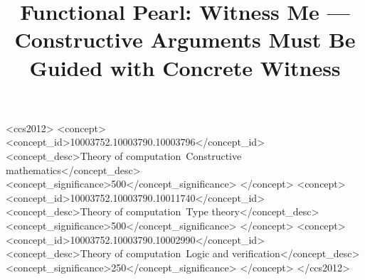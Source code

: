 \documentclass[sigplan,review]{acmart}
\begin{document}
\title[Functional Pearl: Witness Me]{Functional Pearl: Witness Me --- Constructive Arguments Must Be Guided with Concrete Witness}



\begin{abstract}
  
\end{abstract}

\begin{CCSXML}
<ccs2012>
   <concept>
       <concept_id>10003752.10003790.10003796</concept_id>
       <concept_desc>Theory of computation~Constructive mathematics</concept_desc>
       <concept_significance>500</concept_significance>
       </concept>
   <concept>
       <concept_id>10003752.10003790.10011740</concept_id>
       <concept_desc>Theory of computation~Type theory</concept_desc>
       <concept_significance>500</concept_significance>
       </concept>
   <concept>
       <concept_id>10003752.10003790.10002990</concept_id>
       <concept_desc>Theory of computation~Logic and verification</concept_desc>
       <concept_significance>250</concept_significance>
       </concept>
 </ccs2012>
\end{CCSXML}



\end{document}
